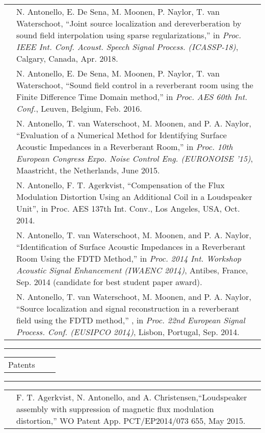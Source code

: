 \documentclass[10pt,A4]{article}
\newcommand{\tzlarrow}{(0,0) -- (0.2,0) -- (0.3,0.2) -- (0.2,0.4) -- (0,0.4) -- (0.1,0.2) -- cycle;}
\newcommand{\larrow}[1]
{\begin{tikzpicture}[scale=0.58]
	 \filldraw[fill=#1!100,draw=#1!100!black]  \tzlarrow
 \end{tikzpicture}
}
\newcommand{\cveventsingle}[4]
{
\vspace{8pt}
	\begin{tabular*}{1\textwidth}{p{5.3cm}  p{4.8cm} x{6.9cm}}
 \textcolor{bgcol}{#1}& \textbf{#2} & \vspace{2.5pt}\textcolor{sectcol}{#3}

	\end{tabular*}
\vspace{-12pt}
\textcolor{softcol}{\hrule}
\vspace{6pt}
	\begin{tabular*}{1\textwidth}{p{0.3cm} p{16.4cm}}
&		 \larrow{bgcol}  #4\\[3pt]
	\end{tabular*}

}
\begin{document}
	\begin{tabular*}{1\textwidth}{p{0.3cm} p{16.4cm}}
& \larrow{bgcol}
N. Antonello, E. De Sena, M. Moonen, P. Naylor, T. van Waterschoot, ``Joint source localization and dereverberation by sound field interpolation using sparse regularizations,''  in {\em Proc. IEEE Int. Conf. Acoust. Speech Signal Process. (ICASSP-18)}, Calgary, Canada, Apr. 2018.
\\[6pt]


& \larrow{bgcol}
N. Antonello, E. De Sena, M. Moonen, P. Naylor, T. van Waterschoot, ``Sound field control in a reverberant room using the Finite Difference Time Domain method,'' in {\em Proc. AES 60th Int. Conf.}, Leuven, Belgium, Feb. 2016.
\\[6pt]

& \larrow{bgcol}
{N. Antonello, T. van Waterschoot, M. Moonen, and P. A. Naylor}, {``Evaluation of a Numerical Method for Identifying Surface Acoustic Impedances in a Reverberant Room,''} in {\em Proc. 10th European Congress Expo. Noise Control Eng. (EURONOISE '15)}, Maastricht, the Netherlands, June 2015.
\\[3pt]

& \larrow{bgcol}
N. Antonello, F. T. Agerkvist, ``Compensation of the Flux Modulation Distortion Using an Additional Coil in a Loudspeaker Unit'', in Proc. AES 137th Int. Conv., Los Angeles, USA, Oct. 2014.
\\[3pt]

& \larrow{bgcol}
{N. Antonello, T. van Waterschoot, M. Moonen, and P. A. Naylor},{ ``Identification of Surface Acoustic Impedances in a Reverberant Room Using the FDTD Method,''} in {\em Proc. 2014 Int. Workshop Acoustic Signal Enhancement (IWAENC 2014)}, Antibes, France, Sep. 2014 (candidate for best student paper award).
\\[3pt]


& \larrow{bgcol}
{N. Antonello, T. van Waterschoot, M. Moonen, and P. A. Naylor},{ ``Source localization and signal reconstruction in a reverberant field using the FDTD method,''} , in {\em Proc. 22nd European Signal Process. Conf. (EUSIPCO 2014)}, Lisbon, Portugal, Sep. 2014.
\\[3pt]

	\end{tabular*}

\textcolor{softcol}{\hrule}
\cveventsingle{Patents}{}{ }{
{F. T. Agerkvist, N. Antonello, and A. Christensen},``Loudspeaker assembly with suppression of magnetic flux modulation distortion,'' WO Patent App. PCT/EP2014/073 655, May 2015.
}
\end{document}
